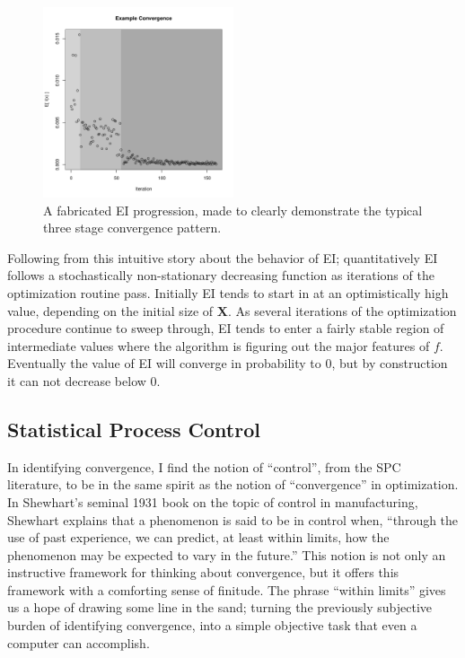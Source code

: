 \documentclass[12pt]{article}
\begin{document}
	\begin{figure}
	\vspace{-1.1cm}
	\begin{center}
	\includegraphics[width=0.5\textwidth]{./figures/exampleEI.pdf}
	\end{center}
	\vspace{-0.85cm}
	\caption{A fabricated EI progression, made to clearly demonstrate the typical three stage convergence pattern.}
	\label{EIxEX}
	\end{figure}
	
	Following from this intuitive story about the behavior of EI; quantitatively EI follows a stochastically non-stationary decreasing function as iterations of the optimization routine pass.
	Initially EI tends to start in at an optimistically high value, depending on the initial size of $\bm{X}$.
	As several iterations of the optimization procedure continue to sweep through, EI tends to enter a fairly stable region of intermediate values where the algorithm is figuring out the major features of $f$.
	Eventually the value of EI will converge in probability to 0, but by construction it can not decrease below 0.
	
	\subsection{Statistical Process Control}
	
	In identifying convergence, I find the notion of ``control'', from the SPC literature, to be in the same spirit as the notion of ``convergence'' in optimization. 
	In Shewhart's seminal 1931 book \cite{shewhartBook} on the topic of control in manufacturing, Shewhart explains that a phenomenon is said to be in control when, ``through the use of past experience, we can predict, at least within limits, how the phenomenon may be expected to vary in the future.''
	This notion is not only an instructive framework for thinking about convergence, but it offers this framework with a comforting sense of finitude. 
	The phrase ``within limits'' gives us a hope of drawing some line in the sand; turning the previously subjective burden of identifying convergence, into a simple objective task that even a computer can accomplish.
	
\end{document}
